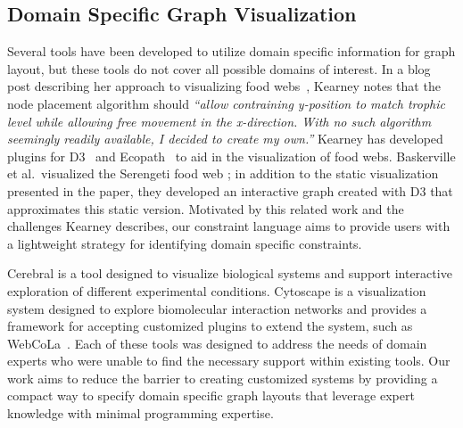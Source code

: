 
\subsection{Domain Specific Graph Visualization}
 Several tools have been developed to utilize
domain specific information for graph layout, but these tools do not cover
all possible domains of interest. In a blog post describing her approach to
visualizing food webs~\cite{kearney2016blog}, Kearney notes that the node
placement algorithm should \emph{``allow contraining y-position to match
  trophic level while allowing free movement in the x-direction. With no
  such algorithm seemingly readily available, I decided to create my
  own.''} Kearney has developed plugins for D3~\cite{kearney2017d3} and
Ecopath~\cite{kearney2017ecopath} to aid in the visualization of
food webs. Baskerville et al.\ visualized the Serengeti food web
\cite{baskerville2011spatial}; in addition to the static visualization
presented in the paper, they developed an interactive graph
\cite{baskerville2011interactive} created with D3 that approximates this
static version.  Motivated by this related work and the
challenges Kearney describes, our constraint language aims to provide users
with a lightweight strategy for identifying domain specific constraints.

Cerebral \cite{barsky2008cerebral} is a tool designed to visualize
biological systems and support interactive exploration of different
experimental conditions. Cytoscape \cite{shannon2003cytoscape} is a
visualization system designed to explore biomolecular interaction networks
and provides a framework for accepting customized plugins to extend the
system, such as WebCoLa~\cite{WebCoLa}. Each of these tools was designed to
address the needs of domain experts who were unable to find the necessary
support within existing tools. Our work aims to reduce the barrier to
creating customized systems by providing a compact way to specify domain
specific graph layouts that leverage expert knowledge with minimal
programming expertise.





